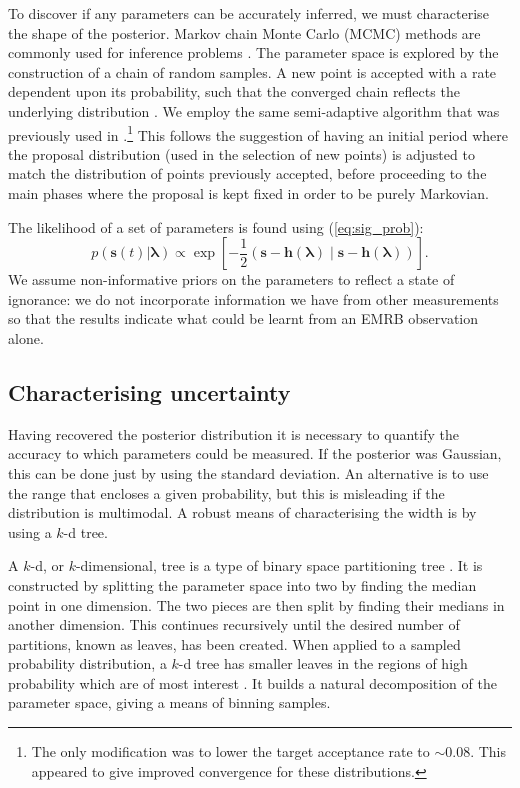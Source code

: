 \documentclass[useAMS,usedcolumn,usegraphicx,usenatbib]{mn2e}
\newcommand{\eqnref}[1]{(\ref{eq:#1})}
\newcommand{\recip}[1]{\ensuremath{\frac{1}{#1}}}
\newcommand{\innerprod}[2]{\ensuremath{\left({#1}\middle|{#2}\right)}}
\begin{document}
To discover if any parameters can be accurately inferred, we must characterise the shape of the posterior. Markov chain Monte Carlo (MCMC) methods are commonly used for inference problems \citep[chapter 29]{MacKay2003}. The parameter space is explored by the construction of a chain of random samples. A new point is accepted with a rate dependent upon its probability, such that the converged chain reflects the underlying distribution \citep{Metropolis1953,Hastings1970}. We employ the same semi-adaptive algorithm that was previously used in \citet{Berry2013}.\footnote{The only modification was to lower the target acceptance rate to $\sim0.08$. This appeared to give improved convergence for these distributions.} This follows the suggestion of \citet*{Haario1999} having an initial period where the proposal distribution (used in the selection of new points) is adjusted to match the distribution of points previously accepted, before proceeding to the main phases where the proposal is kept fixed in order to be purely Markovian.

The likelihood of a set of parameters is found using \eqnref{sig_prob}:
\begin{equation}
p(\boldsymbol{s}(t)|\boldsymbol{\lambda}) \propto \exp\left[-\recip{2}\innerprod{\boldsymbol{s}-\boldsymbol{h}(\boldsymbol{\lambda})}{\boldsymbol{s}-\boldsymbol{h}(\boldsymbol{\lambda})}\right].
\label{eq:likelihood}
\end{equation}
We assume non-informative priors on the parameters to reflect a state of ignorance: we do not incorporate information we have from other measurements so that the results indicate what could be learnt from an EMRB observation alone.

\subsection{Characterising uncertainty}

Having recovered the posterior distribution it is necessary to quantify the accuracy to which parameters could be measured. If the posterior was Gaussian, this can be done just by using the standard deviation. An alternative is to use the range that encloses a given probability, but this is misleading if the distribution is multimodal. A robust means of characterising the width is by using a $k$-d tree.

A $k$-d, or $k$-dimensional, tree is a type of binary space partitioning tree \citep[sections 5.2, 12.1, 12.3]{Berg2008}. It is constructed by splitting the parameter space into two by finding the median point in one dimension. The two pieces are then split by finding their medians in another dimension. This continues recursively until the desired number of partitions, known as leaves, has been created. When applied to a sampled probability distribution, a $k$-d tree has smaller leaves in the regions of high probability which are of most interest \citep{Weinberg2012}. It builds a natural decomposition of the parameter space, giving a means of binning samples.
\end{document}

